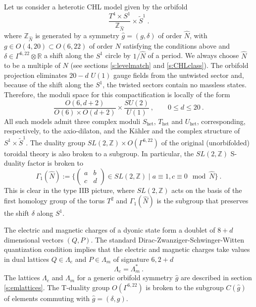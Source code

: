 \documentclass[a4paper,11pt]{article}
\newcommand{\RR}{\mathbb{R}}
\newcommand{\ZZ}{\mathbb{Z}}
\numberwithin{equation}{section}
\def\be{\begin{equation}}
\def\ee{\end{equation}}
\begin{document}
Let us consider a heterotic CHL model given by the orbifold
\be \frac{T^4\times S^1}{\ZZ_{\hat N}}\times \tilde S^1\ .
\ee where $\ZZ_{\hat N}$ is generated by a symmetry $\hat g=(g,\delta)$ of order $\hat N$, with $g\in O(4,20)\subset O(6,22)$ of order $N$ satisfying the conditions above and $\delta\in \Gamma^{6,22}\otimes \RR$ a shift along the $S^1$ circle by $1/\hat N$ of a period. We always choose $\hat N$ to be a multiple  of $N$ (see sections \ref{s:levelmatch} and \ref{s:CHLclass}).
The orbifold projection eliminates $20-d$ $U(1)$ gauge fields from the untwisted sector and, because of the shift along the $S^1$, the twisted sectors contain no massless states. Therefore, the moduli space for this compactification is locally of the form
\be \frac{O(6,d+2)}{O(6)\times O(d+2)}\times \frac{SU(2)}{U(1)}\ ,\qquad  0\le d\le 20\ .
\ee All such models admit three complex moduli $S_{\text{het}}$, $T_{\text{het}}$ and $U_{\text{het}}$, corresponding, respectively, to the axio-dilaton, and the K\"ahler and the complex structure of $S^1\times \tilde S^1$.
The duality group $SL(2,\ZZ)\times O(\Gamma^{6,22})$ of the original (unorbifolded) toroidal theory is also broken to a subgroup.
In particular, the $SL(2,\ZZ)$ S-duality factor is broken to
\be \Gamma_1(\hat N):=\{ \left(\begin{smallmatrix}
a & b \\ c & d
\end{smallmatrix}\right)\in SL(2,\ZZ)\mid a\equiv 1, c\equiv 0\mod \hat N  \}\ .
\ee  This is clear in the type IIB picture, where $SL(2,\ZZ)$ acts on the basis of the first homology group of the torus $T^2$ and $\Gamma_1(\hat N)$ is the subgroup that preserves the shift $\delta$ along $S^1$.

\bigskip

The electric and magnetic charges of a dyonic state form a doublet of $8+d$ dimensional vectors $(Q,P)$.  The standard Dirac-Zwanziger-Schwinger-Witten quantization condition implies that the electric and magnetic charges take values in dual lattices $Q\in \Lambda_e$ and $P\in \Lambda_m$ of signature $6,2+d$
\be \Lambda_e=\Lambda_m^*\ .
\ee The lattices $\Lambda_e$ and $\Lambda_m$ for a generic orbifold symmetry $\hat g$ are described in section \ref{s:emlattices}. 
The T-duality group $O(\Gamma^{6,22})$ is broken to the subgroup $C(\hat g)$ of elements commuting with $\hat g=(\delta,g)$.
\end{document}
